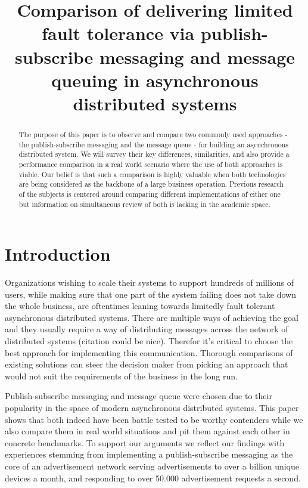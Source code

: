 \documentclass[conference]{IEEEtran}
\begin{document}
\title{Comparison of delivering limited fault tolerance via publish-subscribe messaging and message queuing in asynchronous distributed systems}

\author{
}

\maketitle

\begin{abstract}
The purpose of this paper is to observe and compare two commonly used approaches - the publish-subscribe messaging and the message queue - for building an asynchronous distributed system. We will survey their key differences, similarities, and also provide a performance comparison in a real world scenario where the use of both approaches is viable. Our belief is that such a comparison is highly valuable when both technologies are being considered as the backbone of a large business operation. Previous research of the subjects is centered around comparing different implementations of either one but information on simultaneous review of both is lacking in the academic space.
\end{abstract}

\section{Introduction}
Organizations wishing to scale their systems to support hundreds of millions of users, while making sure that one part of the system failing does not take down the whole business, are oftentimes leaning towards limitedly fault tolerant asynchronous distributed systems. There are multiple ways of achieving the goal and they usually require a way of distributing messages across the network of distributed systems (citation could be nice). Therefor it's critical to choose the best approach for implementing this communication. Thorough comparisons of existing solutions can steer the decision maker from picking an approach that would not suit the requirements of the business in the long run.

\indent Publish-subscribe messaging and message queue were chosen due to their popularity in the space of modern asynchronous distributed systems. This paper shows that both indeed have been battle tested to be worthy contenders while we also compare them in real world situations and pit them against each other in concrete benchmarks. To support our arguments we reflect our findings with experiences stemming from implementing a publish-subscribe messaging as the core of an advertisement network serving advertisements to over a billion unique devices a month, and responding to over 50.000 advertisement requests a second.
\end{document}
